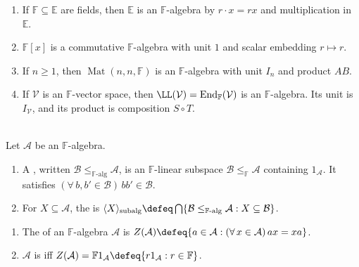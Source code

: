 \begin{example} \label{ex:basic-associative-algebras} 
\begin{enumerate}[label=(\roman*)]
\setlength{\itemsep}{0pt}
\item If $\mathbb{F}\subseteq\mathbb{E}$ are fields, then $\mathbb{E}$ is an $\mathbb{F}$-algebra by $r\cdot x=rx$ and multiplication in $\mathbb{E}$.
\item $\mathbb{F}[x]$ is a commutative $\mathbb{F}$-algebra with unit $1$ and scalar embedding $r\mapsto r$.
\item If $n\geq1$, then $\operatorname{Mat}(n,n,\mathbb{F})$ is an $\mathbb{F}$-algebra with unit $I_n$ and product $AB$.
\item If $\mathcal{V}$ is an $\mathbb{F}$-vector space, then $\LL(\mathcal{V})=\operatorname{End}_{\mathbb{F}}(\mathcal{V})$ is an $\mathbb{F}$-algebra. Its unit is $I_{\mathcal{V}}$, and its product is composition $S\circ T$.
\end{enumerate}
\end{example}

\begin{definition} \label{def:subalgebra-generated-subalgebra} \\
Let $\mathcal{A}$ be an $\mathbb{F}$-algebra.
\begin{enumerate}[label=(\roman*)]
\setlength{\itemsep}{0pt}
\item A , written $\mathcal{B}\leq_{\mathbb{F}\text{-alg}}\mathcal{A}$, is an $\mathbb{F}$-linear subspace $\mathcal{B}\leq_{\mathbb{F}}\mathcal{A}$ containing $1_{\mathcal{A}}$. It satisfies $(\forall\,b,b'\in\mathcal{B})\,bb'\in\mathcal{B}$.
\item For $X\subseteq\mathcal{A}$, the  is $\langle X\rangle_{\operatorname{subalg}}\defeq\bigcap\limits\{\mathcal{B}\leq_{\mathbb{F}\text{-alg}}\mathcal{A}:X\subseteq\mathcal{B}\}$.
\end{enumerate}
\end{definition}

\begin{definition} \label{def:center-and-central-algebra} 
\begin{enumerate}[label=(\roman*)]
\setlength{\itemsep}{0pt}
\item The  of an $\mathbb{F}$-algebra $\mathcal{A}$ is $Z(\mathcal{A})\defeq\{a\in\mathcal{A}:(\forall\,x\in\mathcal{A})\,ax=xa\}$.
\item $\mathcal{A}$ is  iff $Z(\mathcal{A})=\mathbb{F}1_{\mathcal{A}}\defeq\{r1_{\mathcal{A}}:r\in\mathbb{F}\}$.
\end{enumerate}
\end{definition}

